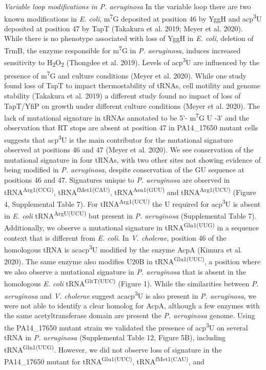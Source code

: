 \documentclass[times, twoside]{zHenriquesLab-StyleBioRxiv}
\begin{document}
\textit{Variable loop modifications in P. aeruginosa} 
\newline
In the variable loop there are two known modifications in \textit{E. coli}, m\textsuperscript{7}G deposited at position 46 by YggH and acp\textsuperscript{3}U deposited at position 47 by TapT (Takakura et al. 2019; Meyer et al. 2020). While there is no phenotype associated with loss of YggH in \textit{E. coli}, deletion of TrmB, the enzyme responsible for m\textsuperscript{7}G in \textit{P. aeruginosa,} induces increased sensitivity to H\textsubscript{2}O\textsubscript{2} (Thongdee et al. 2019). Levels of acp\textsuperscript{3}U are influenced by the presence of m\textsuperscript{7}G and culture conditions (Meyer et al. 2020). While one study found loss of TapT to impact thermostability of tRNAs, cell motility and genome stability (Takakura et al. 2019) a different study found no impact of loss of TapT/YfiP on growth under different culture conditions (Meyer et al. 2020). The lack of mutational signature in tRNAs annotated to be 5'- m\textsuperscript{7}G U -3' and the observation that RT stops are absent at position 47 in PA14\_17650 mutant cells suggests that acp\textsuperscript{3}U is the main contributor for the mutational signature observed at positions 46 and 47 (Meyer et al. 2020). We see conservation of the mutational signature in four tRNAs, with two other sites not showing evidence of being modified in \textit{P. aeruginosa}, despite conservation of the GU sequence at positions 46 and 47. Signatures unique to \textit{P. aeruginosa} are observed in tRNA\textsuperscript{Arg1(CCG)}, tRNA\textsuperscript{fMet1(CAU)}, tRNA\textsuperscript{Asn1(GUU)} and tRNA\textsuperscript{Arg1(UCU)} (Figure 4, Supplemental Table 7). For tRNA\textsuperscript{Arg}\textsuperscript{1(UCU)} the U required for acp\textsuperscript{3}U is absent in \textit{E. coli} tRNA\textsuperscript{A}\textsuperscript{rgU}\textsuperscript{(}\textsuperscript{UCU)} but present in \textit{P. aeruginosa }(Supplemental Table 7). Additionally, we observe a mutational signature in tRNA\textsuperscript{Gln1(UUG)} in a sequence context that is different from \textit{E. coli}. In \textit{V. cholerae}, position 46 of the homologous tRNA is acacp\textsuperscript{3}U modified by the enzyme AcpA (Kimura et al. 2020). The same enzyme also modifies U20B in tRNA\textsuperscript{Glu}\textsuperscript{1(UUC)}, a position where we also observe a mutational signature in \textit{P. aeruginosa} that is absent in the homologous \textit{E. coli }tRNA\textsuperscript{GltT}\textsuperscript{(}\textsuperscript{UUC)} (Figure 1). While the similarities between \textit{P. aeruginosa} and \textit{V. cholerae} suggest acacp\textsuperscript{3}U is also present in \textit{P. aeruginosa}, we were not able to identify a clear homolog for AcpA, although a few enzymes with the same acetyltransferase domain are present the \textit{P. aeruginosa} genome. Using the PA14\_17650 mutant strain we validated the presence of acp\textsuperscript{3}U on several tRNA in \textit{P. aeruginosa} (Supplemental Table 12, Figure 5B), including tRNA\textsuperscript{Gln1(UUG)}. However, we did not observe loss of signature in the PA14\_17650 mutant for tRNA\textsuperscript{Glu1(UUC)}, tRNA\textsuperscript{fMet1(CAU}\textsuperscript{)}, and 
\end{document}
